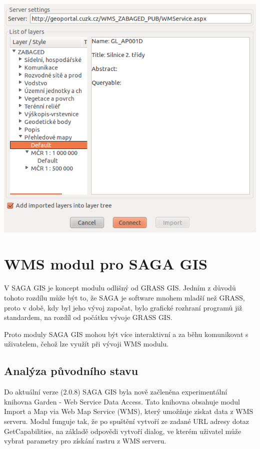 \documentclass[a4paper,12pt]{article}
\begin{document}
\includegraphics[scale=0.5]{figures/GRASS_dialog_soucasny_stav.png}

\newpage

\section{ WMS modul pro SAGA GIS}

V SAGA GIS je koncept modulu odlišný od GRASS GIS. Jedním z důvodů
tohoto rozdílu může být to, že SAGA je software mnohem mladší než
GRASS, proto v době, kdy byl jeho vývoj započat, bylo grafické
rozhraní programů již standardem, na rozdíl od počátku vývoje GRASS
GIS.

Proto moduly SAGA GIS mohou být více interaktivní a za běhu
komunikovat s uživatelem, čehož lze využít při vývoji WMS modulu.

\subsection{Analýza původního stavu}

Do aktuální verze (2.0.8) SAGA GIS byla nově začleněna experimentální
knihovna Garden - Web Service Data Access. Tato knihovna obsahuje
modul Import a Map via Web Map Service (WMS), který umožňuje získat
data z WMS serveru.  Modul funguje tak, že po spuštění vytvoří ze
zadané URL adresy dotaz GetCapabilities, na základě odpovědi vytvoří
dialog, ve kterém uživatel může vybrat parametry pro získání rastru z
WMS serveru.
\end{document}

